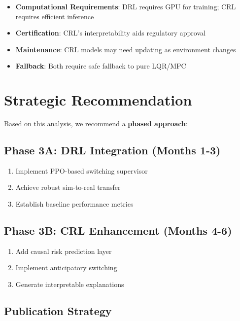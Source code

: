 \documentclass[11pt,a4paper]{article}
\begin{document}
\begin{itemize}
  \item \textbf{Computational Requirements}: DRL requires GPU for training; CRL requires efficient inference
  \item \textbf{Certification}: CRL's interpretability aids regulatory approval
  \item \textbf{Maintenance}: CRL models may need updating as environment changes
  \item \textbf{Fallback}: Both require safe fallback to pure LQR/MPC
\end{itemize}

\section{Strategic Recommendation}

Based on this analysis, we recommend a \textbf{phased approach}:

\subsection{Phase 3A: DRL Integration (Months 1-3)}

\begin{enumerate}
  \item Implement PPO-based switching supervisor
  \item Achieve robust sim-to-real transfer
  \item Establish baseline performance metrics
\end{enumerate}

\subsection{Phase 3B: CRL Enhancement (Months 4-6)}

\begin{enumerate}
  \item Add causal risk prediction layer
  \item Implement anticipatory switching
  \item Generate interpretable explanations
\end{enumerate}

\subsection{Publication Strategy}
\end{document}
